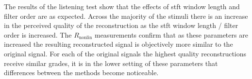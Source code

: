 %
%
		The results of the listening test show that the effects of \acrshort{stft} window length and filter order
		are as expected. Across the majority of the stimuli there is an increase in the perceived quality of the
		reconstruction as the \acrshort{stft} window length / filter order is increased. The $R_{\mathrm{nonlin}}$
		measurements confirm that as these parameters are increased the resulting reconstructed signal is
		objectively more similar to the original signal. For each of the original signals the highest quality
		reconstructions receive similar grades, it is in the lower setting of these parameters that differences
		between the methods become noticeable.

